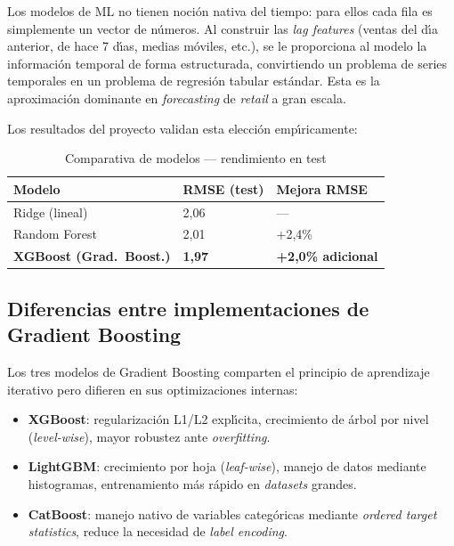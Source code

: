 \documentclass[12pt, a4paper, oneside]{report}
\newcommand{\model}[1]{\textbf{\color{nucliolight}#1}}
\begin{document}
Los modelos de ML no tienen noci\'on nativa del tiempo: para ellos cada fila es simplemente un vector de n\'umeros. Al construir las \textit{lag features} (ventas del d\'{\i}a anterior, de hace 7 d\'{\i}as, medias m\'oviles, etc.), se le proporciona al modelo la informaci\'on temporal de forma estructurada, convirtiendo un problema de series temporales en un problema de regresi\'on tabular est\'andar. Esta es la aproximaci\'on dominante en \textit{forecasting} de \textit{retail} a gran escala.

Los resultados del proyecto validan esta elecci\'on emp\'{\i}ricamente:

\begin{table}[H]
  \centering
  \caption{Comparativa de modelos --- rendimiento en test}
  \label{tab:modelos_comparativa_rapida}
  \begin{tabularx}{0.65\textwidth}{L{4.5cm} C{2.5cm} C{2.5cm}}
    \toprule
    {\color{white}\textbf{Modelo}} & {\color{white}\textbf{RMSE (test)}} & {\color{white}\textbf{Mejora RMSE}} \\
    \midrule
       Ridge (lineal)                & 2,06 & --- \\
      Random Forest                 & 2,01 & +2,4\% \\
       \textbf{XGBoost (Grad.\ Boost.)} & \textbf{1,97} & \textbf{+2,0\% adicional} \\
    \bottomrule
  \end{tabularx}
\end{table}

\subsection{Diferencias entre implementaciones de Gradient Boosting}

Los tres modelos de Gradient Boosting comparten el principio de aprendizaje iterativo pero difieren en sus optimizaciones internas:

\begin{itemize}[leftmargin=*, noitemsep]
  \item \model{XGBoost}: regularizaci\'on L1/L2 expl\'{\i}cita, crecimiento de \'arbol por nivel (\textit{level-wise}), mayor robustez ante \textit{overfitting}.
  \item \model{LightGBM}: crecimiento por hoja (\textit{leaf-wise}), manejo de datos mediante histogramas, entrenamiento m\'as r\'apido en \textit{datasets} grandes.
  \item \model{CatBoost}: manejo nativo de variables categ\'oricas mediante \textit{ordered target statistics}, reduce la necesidad de \textit{label encoding}.
\end{itemize}
\end{document}
